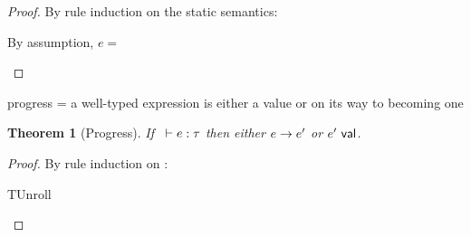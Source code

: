 \documentclass{article}
\DeclareMathOperator{\expand}{\text{\normalfont expand}}
\newtheorem{Theorem}{Theorem}
\begin{document}
\begin{proof}
  By rule induction on the static semantics:
  \begin{byCases}
    \case{\TRoll}
      By assumption, $e = $
    \case{\TUnroll}
  \end{byCases}
\end{proof}





\noindent
progress = a well-typed expression is either a value or on its way to becoming one

\resetpfcounter
\begin{Theorem}[Progress]
  If \usepfcounter[e types]~$\hastype{e}{\tau}$
  then either $e \rightarrow e'$
  or $e'~\mathsf{\normalfont val}$.
\end{Theorem}

\begin{proof}
  By rule induction on :
  \begin{byCases}
    \item[TUnroll]
  \end{byCases}
\end{proof}
\end{document}
